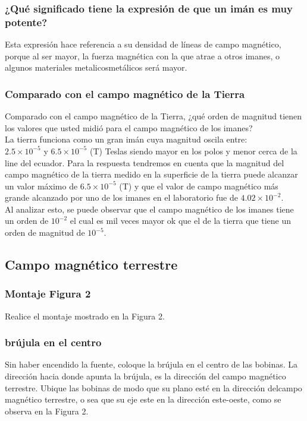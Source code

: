 \subsubsection{¿Qué significado tiene la expresión de que un imán es muy potente?}
Esta expresión hace referencia a su densidad de líneas de campo magnético,
porque al ser mayor, la fuerza magnética con la que atrae a otros imanes, o
algunos materiales metalicosmetálicos será mayor.


\subsubsection{Comparado con el campo magnético de la Tierra}
Comparado con el campo magnético de la Tierra, ¿qué orden de magnitud tienen los
valores que usted midió para el campo magnético de los imanes?\\

La tierra funciona como un gran imán cuya magnitud oscila entre:\\

\(2.5\times10^{-5}\) y \(6.5\times10^{-5}\) (T) Teslas siendo mayor en los polos
y menor cerca de la line del ecuador. Para la respuesta tendremos en cuenta que
la magnitud del campo magnético de la tierra medido en la superficie de la
tierra puede alcanzar un valor máximo de \(6.5\times10^{-5}\) (T) y que el
valor de campo magnético más grande alcanzado por uno de los imanes en el
laboratorio fue de \(4.02\times10^{-2}\).\\

Al analizar esto, se puede observar que el campo magnético de los imanes tiene
un orden de \(10^{-2}\) el cual es mil veces mayor ok que el de la tierra
que tiene un orden de magnitud de \(10^{-5}\).


\subsection{Campo magnético terrestre}

\subsubsection{Montaje Figura 2}
Realice el montaje mostrado en la Figura 2.


\subsubsection{brújula en el centro}
Sin haber encendido la fuente, coloque la brújula en el centro de las bobinas.
La dirección hacia donde apunta la brújula, es la dirección del campo magnético
terrestre. Ubique las bobinas de modo que su plano esté en la dirección delcampo
magnético terrestre, o sea que su eje este en la dirección este-oeste, como se
observa en la Figura 2.


